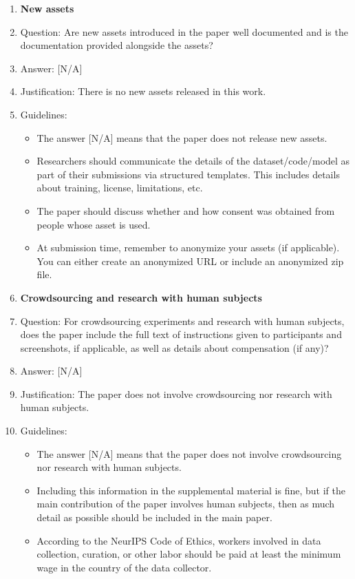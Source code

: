 \documentclass{llmxive}
\providecommand{\answerYes}[1][]{[Yes]#1}
\providecommand{\answerNo}[1][]{[No]#1}
\providecommand{\answerNA}[1][]{[N/A]#1}
\begin{document}
{\begin{enumerate}
\item {\bf New assets}
    \item[] Question: Are new assets introduced in the paper well documented and is the documentation provided alongside the assets?
    \item[] Answer: \answerNA{} %
    \item[] Justification: There is no new assets released in this work.
    \item[] Guidelines:
    \begin{itemize}
        \item The answer \answerNA{} means that the paper does not release new assets.
        \item Researchers should communicate the details of the dataset\slash code\slash model as part of their submissions via structured templates. This includes details about training, license, limitations, etc. 
        \item The paper should discuss whether and how consent was obtained from people whose asset is used.
        \item At submission time, remember to anonymize your assets (if applicable). You can either create an anonymized URL or include an anonymized zip file.
    \end{itemize}

\item {\bf Crowdsourcing and research with human subjects}
    \item[] Question: For crowdsourcing experiments and research with human subjects, does the paper include the full text of instructions given to participants and screenshots, if applicable, as well as details about compensation (if any)? 
    \item[] Answer: \answerNA{} %
    \item[] Justification: The paper does not involve crowdsourcing nor research with human subjects.
    \item[] Guidelines:
    \begin{itemize}
        \item The answer \answerNA{} means that the paper does not involve crowdsourcing nor research with human subjects.
        \item Including this information in the supplemental material is fine, but if the main contribution of the paper involves human subjects, then as much detail as possible should be included in the main paper. 
        \item According to the NeurIPS Code of Ethics, workers involved in data collection, curation, or other labor should be paid at least the minimum wage in the country of the data collector. 
    \end{itemize}


\end{enumerate}}
\end{document}
